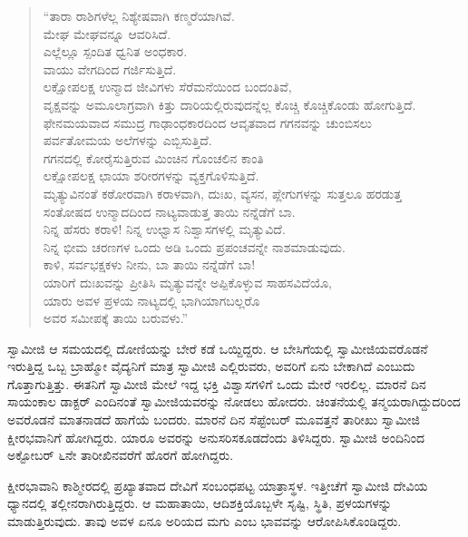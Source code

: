 \begin{verse}
“ತಾರಾ ರಾಶಿಗಳೆಲ್ಲ ನಿಶ್ಯೇಷವಾಗಿ ಕಣ್ಮರೆಯಾಗಿವೆ.\\ಮೇಘ ಮೇಘವನ್ನೂ ಆವರಿಸಿದೆ.\\ಎಲ್ಲೆಲ್ಲೂ ಸ್ಪಂದಿತ ಧ್ವನಿತ ಅಂಧಕಾರ.\\ವಾಯು ವೇಗದಿಂದ ಗರ್ಜಿಸುತ್ತಿದೆ.\\ಲಕ್ಷೋಪಲಕ್ಷ ಉನ್ಮಾದ ಜೀವಿಗಳು ಸೆರೆಮನೆಯಿಂದ ಬಂದಂತಿವೆ,\\ವೃಕ್ಷವನ್ನು ಅಮೂಲಾಗ್ರವಾಗಿ ಕಿತ್ತು ದಾರಿಯಲ್ಲಿರುವುದನ್ನೆಲ್ಲ ಕೊಚ್ಚಿ ಕೊಚ್ಚಿಕೊಂಡು ಹೋಗುತ್ತಿದೆ.\\ಫೇನಮಯವಾದ ಸಮುದ್ರ ಗಾಢಾಂಧಕಾರದಿಂದ ಆವೃತವಾದ ಗಗನವನ್ನು ಚುಂಬಿಸಲು\\ಪರ್ವತೋಮಯ ಅಲೆಗಳನ್ನು ಎಬ್ಬಿಸುತ್ತಿದೆ.\\ಗಗನದಲ್ಲಿ ಕೋರೈಸುತ್ತಿರುವ ಮಿಂಚಿನ ಗೊಂಚಲಿನ ಕಾಂತಿ\\ಲಕ್ಷೋಪಲಕ್ಷ ಛಾಯಾ ಶರೀರಗಳನ್ನು ವ್ಯಕ್ತಗೊಳಿಸುತ್ತಿದೆ.\\ಮೃತ್ಯುವಿನಂತೆ ಕಠೋರವಾಗಿ ಕರಾಳವಾಗಿ, ದುಃಖ, ವ್ಯಸನ, ಪ್ಲೇಗುಗಳನ್ನು ಸುತ್ತಲೂ ಹರಡುತ್ತ\\ಸಂತೋಷದ ಉನ್ಮಾದದಿಂದ ನಾಟ್ಯವಾಡುತ್ತ ತಾಯಿ ನನ್ನೆಡೆಗೆ ಬಾ.\\ನಿನ್ನ ಹೆಸರು ಕರಾಳಿ! ನಿನ್ನ ಉಛ್ವಾಸ ನಿಶ್ವಾಸಗಳಲ್ಲಿ ಮೃತ್ಯುವಿದೆ.\\ನಿನ್ನ ಭೀಮ ಚರಣಗಳ ಒಂದು ಅಡಿ ಒಂದು ಪ್ರಪಂಚವನ್ನೇ ನಾಶಮಾಡುವುದು.\\ಕಾಳಿ, ಸರ್ವಭಕ್ಷಕಳು ನೀನು, ಬಾ ತಾಯಿ ನನ್ನೆಡೆಗೆ ಬಾ!\\ಯಾರಿಗೆ ದುಃಖವನ್ನು ಪ್ರೀತಿಸಿ ಮೃತ್ಯುವನ್ನೇ ಅಪ್ಪಿಕೊಳ್ಳುವ ಸಾಹಸವಿದೆಯೊ,\\ಯಾರು ಅವಳ ಪ್ರಳಯ ನಾಟ್ಯದಲ್ಲಿ ಭಾಗಿಯಾಗಬಲ್ಲರೊ\\ಅವರ ಸಮೀಪಕ್ಕೆ ತಾಯಿ ಬರುವಳು.”
\end{verse}

\vskip 2pt

 ಸ್ವಾಮೀಜಿ ಆ ಸಮಯದಲ್ಲಿ ದೋಣಿಯನ್ನು ಬೇರೆ ಕಡೆ ಒಯ್ದಿದ್ದರು. ಆ ಬೇಸಿಗೆಯಲ್ಲಿ ಸ್ವಾಮೀಜಿಯವರೊಡನೆ ಇರುತ್ತಿದ್ದ ಒಬ್ಬ ಬ್ರಾಹ್ಮೋ ವೈದ್ಯನಿಗೆ ಮಾತ್ರ ಸ್ವಾಮೀಜಿ ಎಲ್ಲಿರುವರು, ಅವರಿಗೆ ಏನು ಬೇಕಾಗಿದೆ ಎಂಬುದು ಗೊತ್ತಾಗುತ್ತಿತ್ತು. ಈತನಿಗೆ ಸ್ವಾಮೀಜಿ ಮೇಲೆ ಇದ್ದ ಭಕ್ತಿ ವಿಶ್ವಾಸಗಳಿಗೆ ಒಂದು ಮೇರೆ ಇರಲಿಲ್ಲ. ಮಾರನೆ ದಿನ ಸಾಯಂಕಾಲ ಡಾಕ್ಟರ್ ಎಂದಿನಂತೆ ಸ್ವಾಮೀಜಿಯವರನ್ನು ನೋಡಲು ಹೋದರು. ಚಿಂತನೆಯಲ್ಲಿ ತನ್ಮಯರಾಗಿದ್ದುದರಿಂದ ಅವರೊಡನೆ ಮಾತನಾಡದೆ ಹಾಗೆಯೆ ಬಂದರು. ಮಾರನೆ ದಿನ ಸೆಪ್ಟೆಂಬರ್ ಮೂವತ್ತನೆ ತಾರೀಖು ಸ್ವಾಮೀಜಿ ಕ್ಷೀರಭವಾನಿಗೆ ಹೋಗಿದ್ದರು. ಯಾರೂ ಅವರನ್ನು ಅನುಸರಿಸಕೂಡದೆಂದು ತಿಳಿಸಿದ್ದರು. ಸ್ವಾಮೀಜಿ ಅಂದಿನಿಂದ ಅಕ್ಟೋಬರ್ ೬ನೇ ತಾರೀಖಿನವರೆಗೆ ಹೊರಗೆ ಹೋಗಿದ್ದರು. 

\vskip 2pt

 ಕ್ಷೀರಭಾವಾನಿ ಕಾಶ್ಮೀರದಲ್ಲಿ ಪ್ರಖ್ಯಾತವಾದ ದೇವಿಗೆ ಸಂಬಂಧಪಟ್ಟ ಯಾತ್ರಾಸ್ಥಳ. ಇತ್ತೀಚೆಗೆ ಸ್ವಾಮೀಜಿ ದೇವಿಯ ಧ್ಯಾನದಲ್ಲಿ ತಲ್ಲೀನರಾಗಿರುತ್ತಿದ್ದರು. ಆ ಮಹಾತಾಯಿ, ಆದಿಶಕ್ತಿಯೊಬ್ಬಳೇ ಸೃಷ್ಟಿ, ಸ್ಥಿತಿ, ಪ್ರಳಯಗಳನ್ನು ಮಾಡುತ್ತಿರುವುದು. ತಾವು ಅವಳ ಏನೂ ಅರಿಯದ ಮಗು ಎಂಬ ಭಾವವನ್ನು ಆರೋಪಿಸಿಕೊಂಡಿದ್ದರು. 

